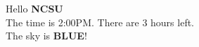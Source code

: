 \documentclass[11pt]{article}
\begin{document}
Hello \textbf{NCSU}
\\The time is 2:00PM.  There are 3 hours left.
\\The sky is \textbf{BLUE}!
\end{document}
